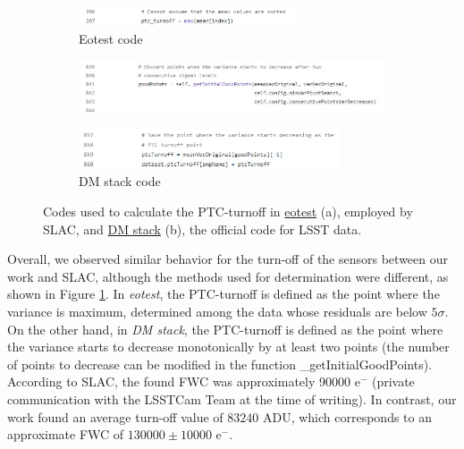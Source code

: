\begin{figure}[!htb]
     \begin{subfigure}[b]{\textwidth}
         
         \includegraphics[width=0.7\textwidth,left]{Figures/eotest_turnoff.jpg}
         \caption{Eotest code}
     \end{subfigure}
     \vspace{3mm}
     \begin{subfigure}[b]{\textwidth}
         
         \includegraphics[width=\textwidth,left]{Figures/DMstack_turnoff1.jpg}
     \end{subfigure}    
     \vspace{3mm}
     \begin{subfigure}[b]{\textwidth}
         
         \includegraphics[width=0.85\textwidth,left]{Figures/DMstack_turnoff2.jpg}
         \caption{DM stack code}
     \end{subfigure}
        \caption{Codes used to calculate the PTC-turnoff in \href{https://github.com/lsst-camera-dh/eotest/blob/32c17b0a33b9c099651ed581ee90c1b1101012fb/python/lsst/eotest/sensor/ptcTask.py}{eotest} (a), employed by SLAC, and \href{https://github.com/lsst/cp_pipe/blob/6bae47012f2f119b186509ce7efd963b68b61f0d/python/lsst/cp/pipe/ptc/cpSolvePtcTask.py}{DM stack} (b), the official code for LSST data.}
        \label{fig:Turnoff_codes}
\end{figure}
Overall, we observed similar behavior for the turn-off of the sensors between our work and SLAC, although the methods used for determination were different, as shown in Figure \ref{fig:Turnoff_codes}. In \textit{eotest}, the PTC-turnoff is defined as the point where the variance is maximum, determined among the data whose residuals are below $5\sigma$. On the other hand, in \textit{DM stack}, the PTC-turnoff is defined as the point where the variance starts to decrease monotonically by at least two points (the number of points to decrease can be modified in the function \_getInitialGoodPoints). According to SLAC, the found FWC was approximately 90000 e$^-$ (private communication with the LSSTCam Team at the time of writing). In contrast, our work found an average turn-off value of $83240$ ADU, which corresponds to an approximate FWC of $130000 \pm 10000$ e$^-$.

